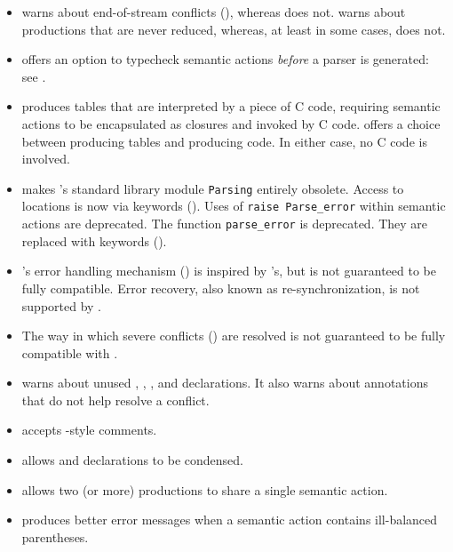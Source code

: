 \documentclass[onecolumn,11pt,nocopyrightspace,preprint]{sigplanconf}
\begin{document}
\begin{itemize}
\item \menhir warns about end-of-stream conflicts (), whereas
      \ocamlyacc does not. \menhir warns about productions that are never
      reduced, whereas, at least in some cases, \ocamlyacc does not.

\item \menhir offers an option to typecheck semantic actions \emph{before}
      a parser is generated: see \oinfer.

\item \ocamlyacc produces tables that are interpreted by a piece of C code,
      requiring semantic actions to be encapsulated as \ocaml closures and
      invoked by C code. \menhir offers a choice between producing tables
      and producing code. In either case, no C code is involved.

\item \menhir makes \ocaml's standard library module \texttt{Parsing}
      entirely obsolete. Access to locations is now via keywords
      ().  Uses of \verb+raise Parse_error+ within
      semantic actions are deprecated.  The function \verb+parse_error+ is
      deprecated. They are replaced with keywords ().

\item \menhir's error handling mechanism () is inspired
      by \ocamlyacc's, but is not guaranteed to be fully
      compatible. Error recovery, also known as re-synchronization, is not
      supported by \menhir.

\item The way in which severe conflicts () are resolved
      is not guaranteed to be fully compatible with \ocamlyacc.

\item \menhir warns about unused \dtoken, \dnonassoc, \dleft, and \dright
      declarations. It also warns about \dprec annotations that do not
      help resolve a conflict.

\item \menhir accepts \ocaml-style comments.

\item \menhir allows \dstart and \dtype declarations to be condensed.

\item \menhir allows two (or more) productions to share a single semantic action.

\item \menhir produces better error messages when a semantic action
      contains ill-balanced parentheses.


\end{itemize}
\end{document}
